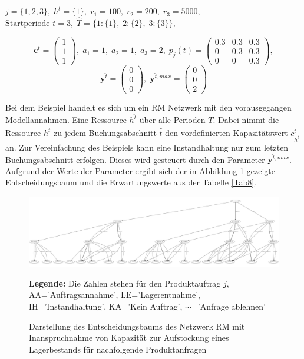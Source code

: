 \begin{center}
$j = \{1, 2, 3\}, \; h^{\hat{t}} = \{1\}, \; r_{1} = 100, \; r_{2} = 200, \; r_{3} = 5000,$ \\
$\text{Startperiode } t=3, \; \hat{T}= \{1: \{1\},\; 2: \{2\},\;3: \{3\} \} $,
\end{center}
\[
    \textbf{c}^{\hat{t}}=\begin{pmatrix} 1\\ 1\\ 1  \end{pmatrix}, \;
    a_{1}=1, \;
     a_{2}=1, \;
       a_{3}=2, \;
            p_{j}(t)=
       \begin{pmatrix}
       0.3 & 0.3 & 0.3 \\
0 & 0.3 & 0.3 \\
0 & 0 & 0.3
\end{pmatrix}, 
  \]
  \[
    \textbf{y}^{\hat{t}}= \begin{pmatrix} 0\\ 0\\ 0  \end{pmatrix}, \;
    \textbf{y}^{\hat{t},max}=\begin{pmatrix} 0\\ 0\\ 2  \end{pmatrix}
      \]

Bei dem Beispiel handelt es sich um ein RM Netzwerk mit den vorausgegangen Modellannahmen. Eine Ressource $h^{\hat{t}}$ über alle Perioden $T$. Dabei nimmt die Ressource $h^{\hat{t}}$ zu jedem Buchungsabschnitt $\hat{t}$ den vordefinierten Kapazitätswert $c^{\hat{t}}_{h^{\hat{t}}}$ an. Zur Vereinfachung des Beispiels kann eine Instandhaltung nur zum letzten Buchungsabschnitt erfolgen. Dieses wird gesteuert durch den Parameter $\textbf{y}^{\hat{t},max}$. Aufgrund der Werte der Parameter ergibt sich der in Abbildung \ref{B8} gezeigte Entscheidungsbaum und die Erwartungswerte aus der Tabelle \ref{Tab8}.

\begin{figure}[h!]
  \begin{center}
    \includegraphics[width=200mm, angle=90]{Bilder/Beispiel8.pdf}
    \caption{Darstellung des Entscheidungsbaums des Netzwerk RM mit Inanspruchnahme von Kapazität zur Aufstockung eines Lagerbestands für nachfolgende Produktanfragen}  \label{B8}
    {\footnotesize \textbf{Legende:} Die Zahlen stehen für den Produktauftrag $j$, AA='Auftragsannahme', LE='Lagerentnahme', IH='Instandhaltung', KA='Kein Auftrag', $\cdots$='Anfrage ablehnen'} 
  \end{center}
\end{figure}

